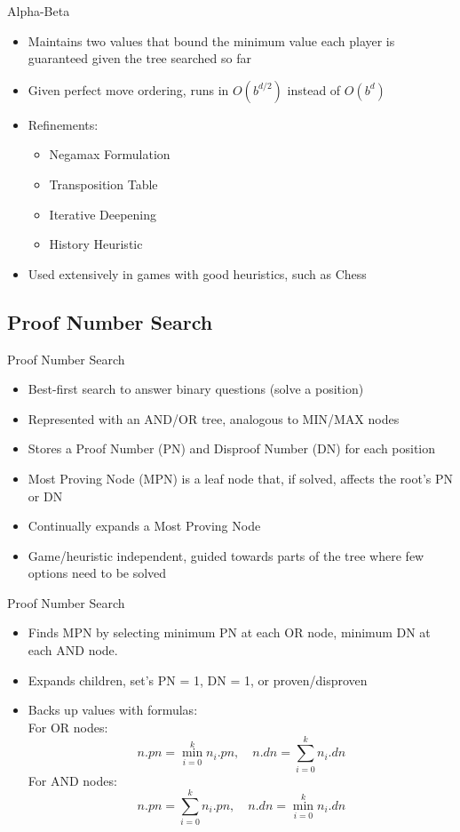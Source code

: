 \documentclass{beamer} %
\begin{document}
\begin{frame}{Alpha-Beta}
\begin{itemize}
	\item Maintains two values that bound the minimum value each player is guaranteed given the tree searched so far
	\item Given perfect move ordering, runs in $O(b^{d/2})$ instead of $O(b^d)$
	\item Refinements:
	\begin{itemize}
		\item Negamax Formulation
		\item Transposition Table
		\item Iterative Deepening
		\item History Heuristic
	\end{itemize}
	\item Used extensively in games with good heuristics, such as Chess
\end{itemize}
\end{frame}


\subsection{Proof Number Search}

\begin{frame}{Proof Number Search}
\begin{itemize}
	\item Best-first search to answer binary questions (solve a position)
	\item Represented with an AND/OR tree, analogous to MIN/MAX nodes
	\item Stores a Proof Number (PN) and Disproof Number (DN) for each position
	\item Most Proving Node (MPN) is a leaf node that, if solved, affects the root's PN or DN
	\item Continually expands a Most Proving Node
	\item Game/heuristic independent, guided towards parts of the tree where few options need to be solved
\end{itemize}
\end{frame}


\begin{frame}{Proof Number Search}
\begin{itemize}
	\item Finds MPN by selecting minimum PN at each OR node, minimum DN at each AND node.
	\item Expands children, set's PN = 1, DN = 1, or proven/disproven
	\item Backs up values with formulas: \\
	For OR nodes: $$ n.pn = \displaystyle\min\limits_{i=0}^k n_i.pn,\quad n.dn = \displaystyle\sum\limits_{i=0}^k n_i.dn $$ For AND nodes: $$ n.pn = \displaystyle\sum\limits_{i=0}^k n_i.pn, \quad n.dn = \displaystyle\min\limits_{i=0}^k n_i.dn $$
\end{itemize}
\end{frame}
\end{document}
